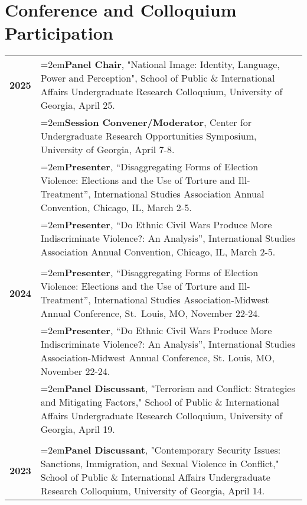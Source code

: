 \documentclass[letterpaper,12pt]{article}
\begin{document}
\section{Conference and Colloquium Participation}
\begin{xltabular}{\dimexpr\textwidth-0in}{p{.85in}X}
\textbf{2025} & \hangindent=2em\textbf{Panel Chair}, "National Image: Identity, Language, Power and Perception", School of \mbox{Public} \& International Affairs Undergraduate Research Colloquium, University of \mbox{Georgia}, April 25.\\
                     & \hangindent=2em\textbf{Session Convener/Moderator}, Center for Undergraduate Research Opportunities \mbox{Symposium}, University of Georgia, April 7-8.\\
                     & \hangindent=2em\textbf{Presenter}, ``Disaggregating Forms of Election Violence: Elections and the Use of Torture and Ill-Treatment”, International Studies Association Annual Convention, Chicago, IL, March 2-5.\\
                     & \hangindent=2em\textbf{Presenter}, ``Do Ethnic Civil Wars Produce More Indiscriminate Violence?: An Analysis”, International Studies Association Annual Convention, Chicago, IL, March 2-5.\\ \\
\textbf{2024} & \hangindent=2em\textbf{Presenter}, ``Disaggregating Forms of Election Violence: Elections and the Use of \mbox{Torture} and Ill-Treatment”, International Studies Association-Midwest Annual Conference, \mbox{St. Louis}, MO, November 22-24.\\
                     & \hangindent=2em\textbf{Presenter}, ``Do Ethnic Civil Wars Produce More Indiscriminate Violence?: An \mbox{Analysis}”, International Studies Association-Midwest Annual Conference, St. Louis, MO, \mbox{November} 22-24.\\
                     & \hangindent=2em\textbf{Panel Discussant}, "Terrorism and Conflict: Strategies and Mitigating Factors," School of Public \& International Affairs Undergraduate Research Colloquium, University of Georgia, April 19.\\  \\
\textbf{2023} &  \hangindent=2em\textbf{Panel Discussant}, "Contemporary Security Issues: Sanctions, Immigration, and \mbox{Sexual} \mbox{Violence} in Conflict," School of Public \& International Affairs Undergraduate \mbox{Research} \mbox{Colloquium,} University of Georgia, April 14.\\ 
\end{xltabular}
\end{document}
